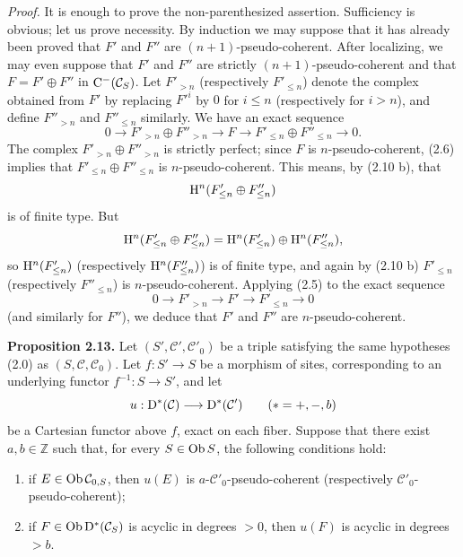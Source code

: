 \documentclass[11pt]{article}
\begin{document}
\emph{Proof.} It is enough to prove the non-parenthesized assertion. Sufficiency is obvious; let us prove necessity. By induction we may suppose that it has already been proved that \(F'\) and \(F''\) are \((n+1)\)-pseudo-coherent. After localizing, we may even suppose that \(F'\) and \(F''\) are strictly \((n+1)\)-pseudo-coherent and that \(F=F'\oplus F''\) in \(\mathrm C^-(\mathcal C_S)\). Let \(F'_{>n}\) (respectively \(F'_{\leq n}\)) denote the complex obtained from \(F'\) by replacing \(F'^i\) by \(0\) for \(i\leq n\) (respectively for \(i>n\)), and define \(F''_{>n}\) and \(F''_{\leq n}\) similarly. We have an exact sequence
\[
  0\longrightarrow F'_{>n}\oplus F''_{>n}\longrightarrow F
  \longrightarrow F'_{\leq n}\oplus F''_{\leq n}\longrightarrow 0 .
\]
The complex \(F'_{>n}\oplus F''_{>n}\) is strictly perfect; since \(F\) is \(n\)-pseudo-coherent, (2.6) implies that \(F'_{\leq n}\oplus F''_{\leq n}\) is \(n\)-pseudo-coherent. This means, by (2.10 b), that
\[
  \mathrm H^n(F'_{\leq n}\oplus F''_{\leq n})
\]
is of finite type. But
\[
  \mathrm H^n(F'_{\leq n}\oplus F''_{\leq n})
  =\mathrm H^n(F'_{\leq n})\oplus \mathrm H^n(F''_{\leq n}),
\]
so \(\mathrm H^n(F'_{\leq n})\) (respectively \(\mathrm H^n(F''_{\leq n})\)) is of finite type, and again by (2.10 b) \(F'_{\leq n}\) (respectively \(F''_{\leq n}\)) is \(n\)-pseudo-coherent. Applying (2.5) to the exact sequence
\[
  0\longrightarrow F'_{>n}\longrightarrow F'\longrightarrow F'_{\leq n}\longrightarrow 0
\]
(and similarly for \(F''\)), we deduce that \(F'\) and \(F''\) are \(n\)-pseudo-coherent.

\textbf{Proposition 2.13.} Let \((S',\mathcal C',\mathcal C'_0)\) be a triple satisfying the same hypotheses (2.0) as \((S,\mathcal C,\mathcal C_0)\). Let \(f:S'\to S\) be a morphism of sites, corresponding to an underlying functor \(f^{-1}:S\to S'\), and let
\[
  u:\mathrm D^*(\mathcal C)\longrightarrow \mathrm D^*(\mathcal C')\qquad (*=+,-,b)
\]
be a Cartesian functor above \(f\), exact on each fiber. Suppose that there exist \(a,b\in\mathbb Z\) such that, for every \(S\in\operatorname{Ob} S\), the following conditions hold:

\begin{enumerate}[label=(\roman*)]
\item if \(E\in\operatorname{Ob}\mathcal C_{0,S}\), then \(u(E)\) is \(a\)-\(\mathcal C'_0\)-pseudo-coherent (respectively \(\mathcal C'_0\)-pseudo-coherent);
\item if \(F\in\operatorname{Ob}\mathrm D^*(\mathcal C_S)\) is acyclic in degrees \(>0\), then \(u(F)\) is acyclic in degrees \(>b\).
\end{enumerate}
\end{document}
